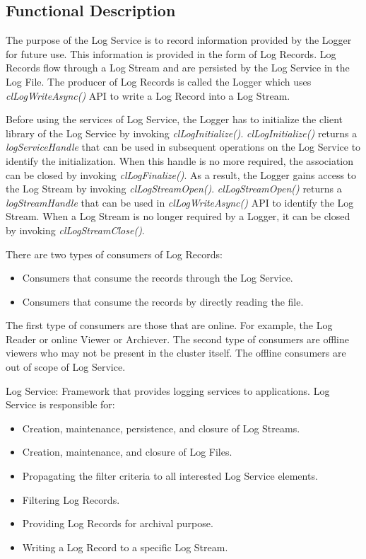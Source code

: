 \begin{flushleft}
\section{Functional Description}
The purpose of the Log Service is to record information provided by the Logger for future use. This information is provided in the form of Log Records.
Log Records flow through a Log Stream and are persisted by the Log Service in the Log File.
The producer of Log Records is called the Logger which uses \textit{clLogWriteAsync()} API to write a Log Record into a Log Stream. 
\par
Before using the services of Log Service, the Logger has to initialize the client library of the Log Service by invoking \textit{clLogInitialize()}. 
\textit{clLogInitialize()} returns a \textit{logServiceHandle} that can be used in subsequent operations on the Log Service to identify the
initialization. When this handle is no more required, the association can be closed by invoking \textit{clLogFinalize()}. As a result, the Logger gains 
access to the Log Stream by invoking \textit{clLogStreamOpen()}. \textit{clLogStreamOpen()} returns a \textit{logStreamHandle} that can be used in 
\textit{clLogWriteAsync()} API to identify the Log Stream. When a Log Stream is no longer required by a Logger, it can be closed by invoking \textit{clLogStreamClose()}. 
\par
There are two types of consumers of Log Records:
\begin{itemize}
\item
Consumers that consume the records through the Log Service.
\item
Consumers that consume the records by directly reading the file. 
\end{itemize}
The first type of consumers are those that are online. For example, the Log Reader or online Viewer or Archiever. 
The second type of consumers are offline viewers who may not be present in the cluster itself. The offline
consumers are out of scope of Log Service.



\begin{Desc}
\item [Log Service:] Framework that provides logging services to applications. Log Service is responsible for:
\begin{itemize}
\item Creation, maintenance, persistence, and closure of Log Streams.
\item 	Creation, maintenance, and closure of Log Files.
\item 	Propagating the filter criteria to all interested Log Service elements.
\item 	Filtering Log Records.
\item 	Providing Log Records for archival purpose.
\item 	Writing a Log Record to a specific Log Stream.
\end{itemize}
\end{Desc}


\end{flushleft}
